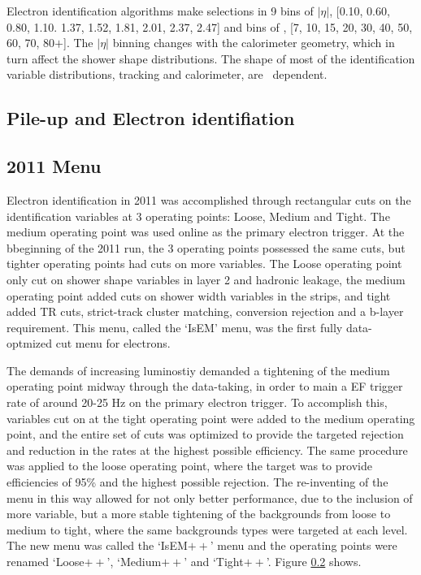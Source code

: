 Electron identification algorithms make selections in 9 bins of $|\eta|$, [0.10, 0.60, 0.80, 1.10. 1.37, 1.52, 1.81, 2.01, 2.37, 2.47] and bins of \pt, [7, 10, 15, 20, 30, 40, 50, 60, 70, 80$+$]. The $|\eta|$ binning changes with the calorimeter geometry, which in turn affect the shower shape distributions. The shape of most of the identification variable distributions, tracking and calorimeter, are \pt\ dependent.  


\begin{figure}

\end{figure}

\subsection{Pile-up and Electron identifiation}

\subsection{2011 Menu}

Electron identification in 2011 was accomplished through rectangular cuts on the identification variables at 3 operating points: Loose, Medium and Tight. The medium operating point was used online as the primary electron trigger. At the bbeginning of the 2011 run, the 3 operating points possessed the same cuts, but tighter operating points had cuts on more variables. The Loose operating point only cut on shower shape variables in layer 2 and hadronic leakage, the medium operating point added cuts on shower width variables in the strips, and tight added TR cuts, strict-track cluster matching, conversion rejection and a b-layer requirement. This menu, called the `IsEM' menu, was the first fully data-optmized cut menu for electrons. 

The demands of increasing luminostiy demanded a tightening of the medium operating point midway through the data-taking, in order to main a EF trigger rate of around 20-25 Hz on the primary electron trigger. To accomplish this, variables cut on at the tight operating point were added to the medium operating point, and the entire set of cuts was optimized to provide the targeted rejection and reduction in the rates at the highest possible efficiency. The same procedure was applied to the loose operating point, where the target was to provide efficiencies of 95\% and the highest possible rejection. The re-inventing of the menu in this way allowed for not only better performance, due to the inclusion of more variable, but a more stable tightening of the backgrounds from loose to medium to tight, where the same backgrounds types were targeted at each level. The new menu was called the `IsEM$++$' menu and the operating points were renamed `Loose$++$', `Medium$++$' and `Tight$++$'. Figure \ref{} shows.

